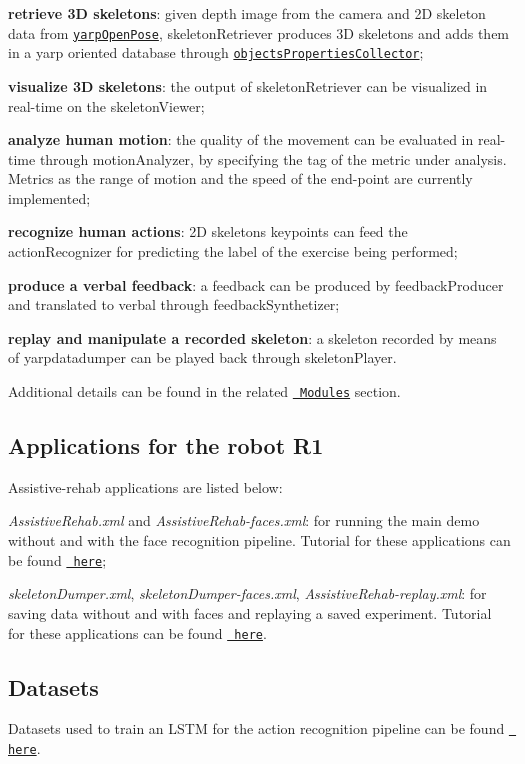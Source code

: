\begin{DoxyItemize}
\item {\bfseries{retrieve 3D skeletons}}\+: given depth image from the camera and 2D skeleton data from \href{https://github.com/robotology/human-sensing}{\texttt{ {\ttfamily yarp\+Open\+Pose}}}, {\ttfamily skeleton\+Retriever} produces 3D skeletons and adds them in a yarp oriented database through \href{http://www.icub.org/doc/icub-main/group__objectsPropertiesCollector.html}{\texttt{ {\ttfamily objects\+Properties\+Collector}}};
\item {\bfseries{visualize 3D skeletons}}\+: the output of {\ttfamily skeleton\+Retriever} can be visualized in real-\/time on the {\ttfamily skeleton\+Viewer};
\item {\bfseries{analyze human motion}}\+: the quality of the movement can be evaluated in real-\/time through {\ttfamily motion\+Analyzer}, by specifying the tag of the metric under analysis. Metrics as the range of motion and the speed of the end-\/point are currently implemented;
\item {\bfseries{recognize human actions}}\+: 2D skeleton\textquotesingle{}s keypoints can feed the {\ttfamily action\+Recognizer} for predicting the label of the exercise being performed;
\item {\bfseries{produce a verbal feedback}}\+: a feedback can be produced by {\ttfamily feedback\+Producer} and translated to verbal through {\ttfamily feedback\+Synthetizer};
\item {\bfseries{replay and manipulate a recorded skeleton}}\+: a skeleton recorded by means of {\ttfamily yarpdatadumper} can be played back through {\ttfamily skeleton\+Player}.
\end{DoxyItemize}

Additional details can be found in the related \href{https://robotology.github.io/assistive-rehab/doc/doxygen/doc/html/modules.html}{\texttt{ Modules}} section.

\subsection*{Applications for the robot R1}

Assistive-\/rehab applications are listed below\+:


\begin{DoxyItemize}
\item {\itshape Assistive\+Rehab.\+xml} and {\itshape Assistive\+Rehab-\/faces.\+xml}\+: for running the main demo without and with the face recognition pipeline. Tutorial for these applications can be found \href{https://robotology.github.io/assistive-rehab/doc/mkdocs/site/main_apps/}{\texttt{ here}};
\item {\itshape skeleton\+Dumper.\+xml}, {\itshape skeleton\+Dumper-\/faces.\+xml}, {\itshape Assistive\+Rehab-\/replay.\+xml}\+: for saving data without and with faces and replaying a saved experiment. Tutorial for these applications can be found \href{https://robotology.github.io/assistive-rehab/doc/mkdocs/site/replay_an_experiment/}{\texttt{ here}}.
\end{DoxyItemize}

\subsection*{Datasets}

Datasets used to train an L\+S\+TM for the action recognition pipeline can be found \href{https://github.com/robotology/assistive-rehab-storage}{\texttt{ here}}. 